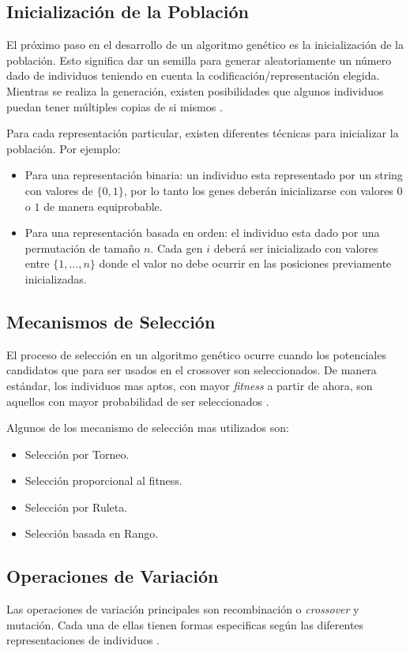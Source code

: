 \subsection{Inicialización de la Población}
El próximo paso en el desarrollo de un algoritmo genético es la inicialización de la población. Esto significa dar un semilla para generar aleatoriamente un número dado de individuos teniendo en cuenta la codificación/representación elegida. Mientras se realiza la generación, existen posibilidades que algunos individuos puedan tener múltiples copias de si mismos \cite{grosan2011intelligent}.

Para cada representación particular, existen diferentes técnicas para inicializar la población. Por ejemplo:

\begin{itemize}
    \item Para una representación binaria: un individuo esta representado por un string con valores de $\{0, 1\}$, por lo tanto los genes deberán inicializarse con valores $0$ o $1$ de manera equiprobable.
    \item Para una representación basada en orden: el individuo esta dado por una permutación de tamaño $n$. Cada gen $i$ deberá ser inicializado con valores entre $\{1, ..., n\}$ donde el valor no debe ocurrir en las posiciones previamente inicializadas.
\end{itemize}

\subsection{Mecanismos de Selección}
El proceso de selección en un algoritmo genético ocurre cuando los potenciales candidatos que para ser usados en el crossover son seleccionados. De manera estándar, los individuos mas aptos, con mayor \emph{fitness} a partir de ahora, son aquellos con mayor probabilidad de ser seleccionados \cite{grosan2011intelligent}.

Algunos de los mecanismo de selección mas utilizados son:

\begin{itemize}
    \item Selección por Torneo.
    \item Selección proporcional al fitness.
    \item Selección por Ruleta.
    \item Selección basada en Rango.
\end{itemize}

\subsection{Operaciones de Variación}
Las operaciones de variación principales son recombinación o \emph{crossover} y mutación. Cada una de ellas tienen formas especificas según las diferentes representaciones de individuos \cite{grosan2011intelligent}.

